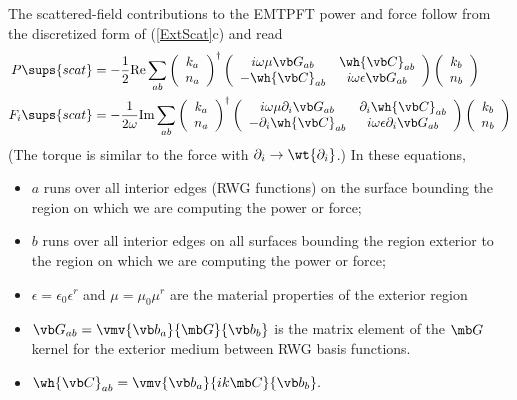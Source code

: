The scattered-field contributions to the EMTPFT power and force 
follow from the discretized form of (\ref{ExtScat}c) and read
\begin{subequations}
\begin{align}
 P\sups{scat}&=-\frac{1}{2}\text{Re} \sum_{ab}
 \left(\begin{array}{c} k_a \\ n_a\end{array}\right)^\dagger
 \left(\begin{array}{cc}i\omega \mu \vb G_{ab} & \wh{\vb C}_{ab} \\
                        -\wh{\vb C}_{ab} & i\omega\epsilon \vb G_{ab}
 \end{array}\right)
 \left(\begin{array}{c}k_b \\ n_b\end{array}\right)
\\
 F_i\sups{scat}&=-\frac{1}{2\omega}\text{Im} \sum_{ab}
 \left(\begin{array}{c} k_a \\ n_a\end{array}\right)^\dagger
 \left(\begin{array}{cc}i\omega \mu \partial_i \vb G_{ab} & \partial_i \wh{\vb C}_{ab} \\
                        -\partial_i \wh{\vb C}_{ab} & i\omega\epsilon \partial_i \vb G_{ab}
 \end{array}\right)
 \left(\begin{array}{c}k_b \\ n_b\end{array}\right)
\end{align}
\label{PFExteriorPFT1}%
\end{subequations}
(The torque is similar to the force with $\partial_i \to \wt{\partial_i}$.)
In these equations, 
\begin{itemize}
\item
$a$ runs over all interior edges (RWG functions) 
on the surface bounding the region on which we are 
computing the power or force;
\item
$b$ runs over all interior edges on all surfaces bounding 
the region exterior to the region on which we are 
computing the power or force;
\item
$\epsilon=\epsilon_0 \epsilon^r$ and 
$\mu=\mu_0 \mu^r$ are the material properties of the 
exterior region
\item
 $\vb G_{ab}=\vmv{\vb b_a}{\mb G}{\vb b_b}$
 is the matrix element of the $\mb G$ kernel for
 the exterior medium between RWG basis functions.
\item
 $\wh{\vb C}_{ab}=\vmv{\vb b_a}{ik\mb C}{\vb b_b}.$
\end{itemize}


